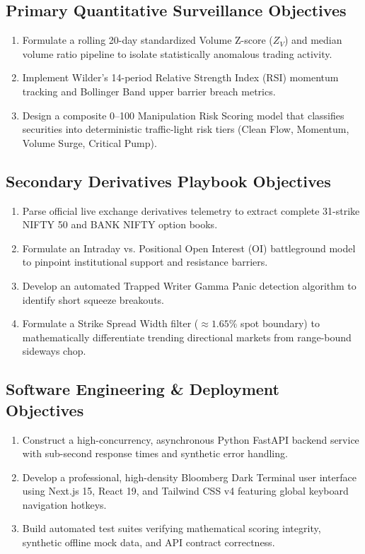 \subsection{Primary Quantitative Surveillance Objectives}
\begin{enumerate}
    \item Formulate a rolling 20-day standardized Volume Z-score ($Z_V$) and median volume ratio pipeline to isolate statistically anomalous trading activity.
    \item Implement Wilder's 14-period Relative Strength Index (RSI) momentum tracking and Bollinger Band upper barrier breach metrics.
    \item Design a composite 0--100 Manipulation Risk Scoring model that classifies securities into deterministic traffic-light risk tiers (Clean Flow, Momentum, Volume Surge, Critical Pump).
\end{enumerate}

\subsection{Secondary Derivatives Playbook Objectives}
\begin{enumerate}
    \item Parse official live exchange derivatives telemetry to extract complete 31-strike NIFTY 50 and BANK NIFTY option books.
    \item Formulate an Intraday vs. Positional Open Interest (OI) battleground model to pinpoint institutional support and resistance barriers.
    \item Develop an automated Trapped Writer Gamma Panic detection algorithm to identify short squeeze breakouts.
    \item Formulate a Strike Spread Width filter ($\approx 1.65\%$ spot boundary) to mathematically differentiate trending directional markets from range-bound sideways chop.
\end{enumerate}

\subsection{Software Engineering \& Deployment Objectives}
\begin{enumerate}
    \item Construct a high-concurrency, asynchronous Python FastAPI backend service with sub-second response times and synthetic error handling.
    \item Develop a professional, high-density Bloomberg Dark Terminal user interface using Next.js 15, React 19, and Tailwind CSS v4 featuring global keyboard navigation hotkeys.
    \item Build automated test suites verifying mathematical scoring integrity, synthetic offline mock data, and API contract correctness.
\end{enumerate}

